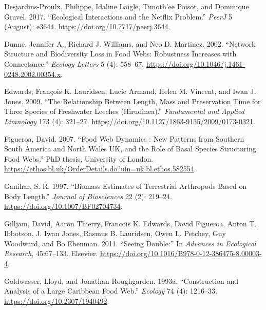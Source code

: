 \documentclass{article}
\newlength{\cslhangindent}
\newlength{\cslentryspacingunit} %
\newenvironment{CSLReferences}[2] %
 {%
  \setlength{\parindent}{0pt}
  \ifodd #1
  \let\oldpar\par
  \def\par{\hangindent=\cslhangindent\oldpar}
  \fi
  \setlength{\parskip}{#2\cslentryspacingunit}
 }%
 {}
\begin{document}
\begin{CSLReferences}{1}{0}
\leavevmode{}%
Desjardins-Proulx, Philippe, Idaline Laigle, Timoth'ee Poisot, and
Dominique Gravel. 2017. {``Ecological Interactions and the {Netflix}
Problem.''} \emph{PeerJ} 5 (August): e3644.
\url{https://doi.org/10.7717/peerj.3644}.

\leavevmode{}%
Dunne, Jennifer A., Richard J. Williams, and Neo D. Martinez. 2002.
{``Network Structure and Biodiversity Loss in Food Webs: Robustness
Increases with Connectance.''} \emph{Ecology Letters} 5 (4): 558--67.
\url{https://doi.org/10.1046/j.1461-0248.2002.00354.x}.

\leavevmode{}%
Edwards, François K. Lauridsen, Lucie Armand, Helen M. Vincent, and Iwan
J. Jones. 2009. {``The Relationship Between Length, Mass and
Preservation Time for Three Species of Freshwater Leeches
({Hirudinea}).''} \emph{Fundamental and Applied Limnology} 173 (4):
321--27. \url{https://doi.org/10.1127/1863-9135/2009/0173-0321}.

\leavevmode{}%
Figueroa, David. 2007. {``Food Web Dynamics : New Patterns from Southern
{South America} and {North Wales UK}, and the Role of Basal Species
Structuring Food Webs.''} PhD thesis, {University of London}.
\url{https://ethos.bl.uk/OrderDetails.do?uin=uk.bl.ethos.582554}.

\leavevmode{}%
Ganihar, S. R. 1997. {``Biomass Estimates of Terrestrial Arthropods
Based on Body Length.''} \emph{Journal of Biosciences} 22 (2): 219--24.
\url{https://doi.org/10.1007/BF02704734}.

\leavevmode{}%
Gilljam, David, Aaron Thierry, Francois K. Edwards, David Figueroa,
Anton T. Ibbotson, J. Iwan Jones, Rasmus B. Lauridsen, Owen L. Petchey,
Guy Woodward, and Bo Ebenman. 2011. {``Seeing {Double}:''} In
\emph{Advances in {Ecological Research}}, 45:67--133. {Elsevier}.
\url{https://doi.org/10.1016/B978-0-12-386475-8.00003-4}.

\leavevmode{}%
Goldwasser, Lloyd, and Jonathan Roughgarden. 1993a. {``Construction and
{Analysis} of a {Large Caribbean Food Web}.''} \emph{Ecology} 74 (4):
1216--33. \url{https://doi.org/10.2307/1940492}.


\end{CSLReferences}
\end{document}
